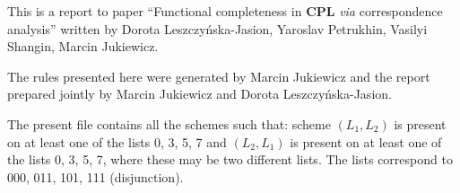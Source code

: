 \documentclass[11pt]{article}
\begin{document}
	
	This is a report to paper ``Functional completeness in \textbf{CPL} \textit{via} correspondence analysis'' written by Dorota Leszczy\'{n}ska-Jasion, 
	Yaroslav Petrukhin, Vasilyi Shangin, Marcin Jukiewicz. 
	
	The rules presented here were generated by Marcin Jukiewicz and the report prepared jointly by Marcin Jukiewicz and Dorota Leszczy\'{n}ska-Jasion.
	
	The present file contains all the schemes such that: scheme $(L_1, L_2)$ is present on at least one of the lists 0, 3, 5, 7 and $(L_2, L_1)$ is present on at least one of the lists 0, 3, 5, 7, where these may be two different lists. The lists correspond to 000, 011, 101, 111 (disjunction).
	
	\bigskip
	
\begin{center}


\end{center}
\end{document}
